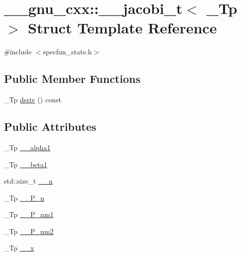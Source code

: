 \hypertarget{struct____gnu__cxx_1_1____jacobi__t}{}\section{\+\_\+\+\_\+gnu\+\_\+cxx\+:\+:\+\_\+\+\_\+jacobi\+\_\+t$<$ \+\_\+\+Tp $>$ Struct Template Reference}
\label{struct____gnu__cxx_1_1____jacobi__t}


{\ttfamily \#include $<$specfun\+\_\+state.\+h$>$}

\subsection*{Public Member Functions}
\begin{DoxyCompactItemize}
\item 
\+\_\+\+Tp \hyperlink{struct____gnu__cxx_1_1____jacobi__t_a2b1a1fc42308cb293dfcb1fa4a8202a6}{deriv} () const
\end{DoxyCompactItemize}
\subsection*{Public Attributes}
\begin{DoxyCompactItemize}
\item 
\+\_\+\+Tp \hyperlink{struct____gnu__cxx_1_1____jacobi__t_ab81da2815aa171345bf3893855b8c9a6}{\+\_\+\+\_\+alpha1}
\item 
\+\_\+\+Tp \hyperlink{struct____gnu__cxx_1_1____jacobi__t_ae1850b318140efaccce735800a4ae3fa}{\+\_\+\+\_\+beta1}
\item 
std\+::size\+\_\+t \hyperlink{struct____gnu__cxx_1_1____jacobi__t_ad84a14f630a5636fa017aaebe4cbc1a1}{\+\_\+\+\_\+n}
\item 
\+\_\+\+Tp \hyperlink{struct____gnu__cxx_1_1____jacobi__t_a3f9683a63df91a8969ac4e456fa022d0}{\+\_\+\+\_\+\+P\+\_\+n}
\item 
\+\_\+\+Tp \hyperlink{struct____gnu__cxx_1_1____jacobi__t_ac7fb1ac753f89af0a158096e1ac84bc3}{\+\_\+\+\_\+\+P\+\_\+nm1}
\item 
\+\_\+\+Tp \hyperlink{struct____gnu__cxx_1_1____jacobi__t_a96be2d9b3e4daddccd75147a3ab1572e}{\+\_\+\+\_\+\+P\+\_\+nm2}
\item 
\+\_\+\+Tp \hyperlink{struct____gnu__cxx_1_1____jacobi__t_aa3213c7241c094633f0be6f210b04e17}{\+\_\+\+\_\+x}
\end{DoxyCompactItemize}


